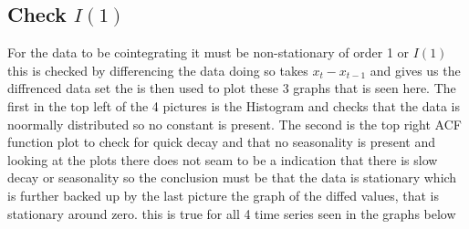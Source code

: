 \subsection{Check $I(1)$}
For the data to be cointegrating it  must be non-stationary of order 1 or $I(1)$ this is checked by differencing the data doing so takes $x_t-x_{t-1}$ and gives us the diffrenced data set the is then used to plot these 3 graphs that is seen here. The first in the top left of the 4 pictures is the Histogram and checks that the data is noormally distributed so no constant is present. The second is the top right ACF function plot to check for quick decay and that no seasonality is present and looking at the plots there does not seam to be a indication that there is slow decay or seasonality so the conclusion must be that the data is stationary which is further backed up by the last picture the graph of the diffed values, that is stationary around zero. this is true for all 4 time series seen in the graphs below

